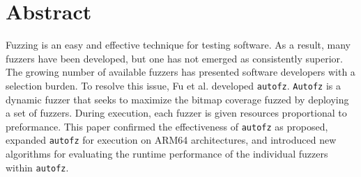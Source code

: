 \section{Abstract}
Fuzzing is an easy and effective technique for testing software. As a result, 
many fuzzers have been developed, but one has not emerged as consistently superior. 
The growing number of available fuzzers has presented software developers with a 
selection burden. To resolve this issue, Fu et al. developed \texttt{autofz}.  
\texttt{Autofz} is a dynamic fuzzer that seeks to maximize the bitmap coverage fuzzed
by deploying a set of fuzzers. During execution, each fuzzer is given resources 
proportional to preformance. \cite{fu_autofz_2023} This paper confirmed the effectiveness of \texttt{autofz} 
as proposed, expanded \texttt{autofz} for execution on ARM64 architectures, and introduced new
algorithms for evaluating the runtime performance of the individual fuzzers within 
\texttt{autofz}. 
